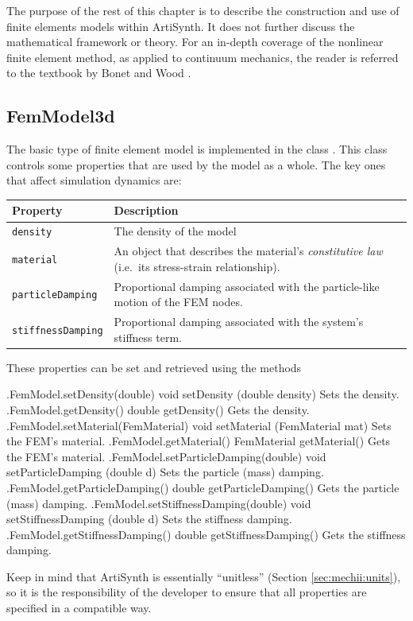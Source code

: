 The purpose of the rest of this chapter is to describe the construction and
use of finite elements models within ArtiSynth.  It does not further discuss 
the mathematical framework or theory.
For an in-depth coverage of the nonlinear finite element method, as applied
to continuum mechanics, the reader is referred to the textbook by Bonet and 
Wood \cite{bonet:fem:2000}.

\subsection{FemModel3d}
\label{sec:fem:structure}

The basic type of finite element model is implemented in the class 
.  This class controls some
properties that are used by the model as a whole.  The key ones that affect
simulation dynamics are:
\begin{center}
\begin{tabular}{|ll|}
\hline
Property & Description\\
\hline
{\tt density} & The density of the model\\
{\tt material} & An object that describes the material's 
\emph{constitutive law} (i.e.~its stress-strain relationship).\\
{\tt particleDamping} & Proportional damping associated with the 
particle-like motion of the FEM nodes.\\
{\tt stiffnessDamping} & Proportional damping associated with the 
system's stiffness term.\\
\hline
\end{tabular}
\end{center}
These properties can be set and retrieved using the methods
%
\begin{methodtable}{0.5}{0.5}
\midline
%
\methodentry
{\fem.FemModel.setDensity(double)}%
{void setDensity (double density)}%
{Sets the density.}%
%
\methodentry
{\fem.FemModel.getDensity()}%
{double getDensity()}%
{Gets the density.}%
\methodspace{0.5em}
%
\methodentry
{\fem.FemModel.setMaterial(FemMaterial)}%
{void setMaterial (FemMaterial mat)}%
{Sets the FEM's material.}%
%
\methodentry
{\fem.FemModel.getMaterial()}%
{FemMaterial getMaterial()}%
{Gets the FEM's material.}%
\methodspace{0.5em}
%
\methodentry
{\fem.FemModel.setParticleDamping(double)}%
{void setParticleDamping (double d)}%
{Sets the particle (mass) damping.}%
%
\methodentry
{\fem.FemModel.getParticleDamping()}%
{double getParticleDamping()}%
{Gets the particle (mass) damping.}%
\methodspace{0.5em}
%
\methodentry
{\fem.FemModel.setStiffnessDamping(double)}%
{void setStiffnessDamping (double d)}%
{Sets the stiffness damping.}%
%
\methodentry
{\fem.FemModel.getStiffnessDamping()}%
{double getStiffnessDamping()}%
{Gets the stiffness damping.}%
%
\midline
\end{methodtable}
%
Keep in mind that ArtiSynth is essentially ``unitless'' (Section 
\ref{sec:mechii:units}), so it is the responsibility of the developer to
ensure that all properties are specified in a compatible way.  


